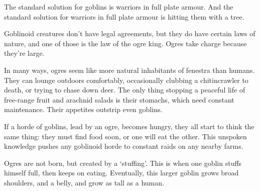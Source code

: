 \begin{multicols}{2}



\noindent
The standard solution for goblins is warriors in full plate armour.
And the standard solution for warriors in full plate armour is hitting them with a tree.

Goblinoid creatures don't have legal agreements, but they do have certain laws of nature, and one of those is the law of the ogre king.
Ogres take charge because they're large.

In many ways, ogres seem like more natural inhabitants of \gls{fenestra} than humans.
They can lounge outdoors comfortably, occasionally clubbing a chitincrawler to death, or trying to chase down deer.
The only thing stopping a peaceful life of free-range fruit and arachnid salads is their stomachs, which need constant maintenance.
Their appetites outstrip even goblins.

If a horde of goblins, lead by an ogre, becomes hungry, they all start to think the same thing: they must find food soon, or one will eat the other.
This unspoken knowledge pushes any goblinoid horde to constant raids on any nearby farms.

Ogres are not born, but created by a `stuffing'.
This is when one goblin stuffs himself full, then keeps on eating.
Eventually, this larger goblin grows broad shoulders, and a belly, and grow as tall as a human.


\end{multicols}
